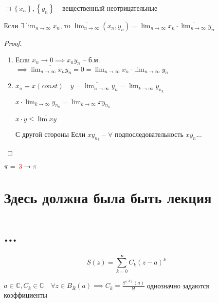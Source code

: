 \documentclass{book}
\renewcommand\C{\ensuremath{\mathbb{C}}}
\newcommand\correct[2]{\ensuremath{\:}{\color{red}{#1}}\ensuremath{\to }{\color{correct}{#2}}\ensuremath{\:}}
\theoremstyle{definition}
\begin{document}
    \begin{lemma}
        $\sqsupset \left\{ x_{n}  \right\} , \left\{ y_{n}  \right\} $ -- вещественный неотрицательные

        Если $\exists \lim_{n \to \infty} x_{n} $, то $\overline{\lim_{n \to \infty} }\left( x_{n} , y_{n}  \right)  = \lim_{n \to \infty} x_{n}  \cdot  \overline{\lim_{n \to \infty} }y_{n} $
    \end{lemma}
    \begin{proof}
        \begin{enumerate}
            \item Если $x_{n} \to 0 \implies x_{n} y_{n} $ -- б.м. $ \implies \overline{\lim_{n \to \infty} x_{n} y_{n} } = 0  = \lim_{n \to \infty} x_{n} \cdot \lim_{n \to \infty} y_{n}  $
            \item $x_{n} \equiv x (const)\quad y = \overline{\lim_{n \to \infty} }y_{n}  = \lim_{k \to \infty} y_{n_k}  $

                $x \cdot  \lim_{k \to \infty} y_{n_k} = \lim_{k \to \infty} xy_{n_k}$

                $x\cdot y \leqslant \overline{\lim xy }$ 

                С другой стороны Если $xy_{n_k}$ --  $\forall $ подпоследовательность $xy_n $...
        \end{enumerate}
    \end{proof}
    
    $\pi = \correct 3 \pi$

    \section{Здесь должна была быть лекция}

    \section{...}

    \[S(z) = \sum_{k=0}^{\infty } C_k \left( z-a \right) ^k\]

    $a\in \C, C_k\in \C\quad \forall z\in B_R(a) \implies C_k = \frac{S^{(k)}(a)}{k!}$ однозначно задаются коэффициенты
\end{document}
